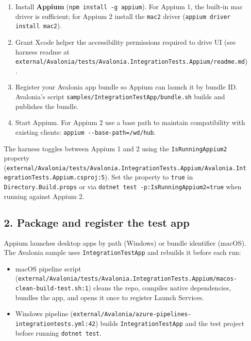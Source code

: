 \begin{enumerate}
\def\labelenumi{\arabic{enumi}.}
\tightlist
\item
  Install \textbf{Appium}
  (\passthrough{\lstinline!npm install -g appium!}). For Appium 1, the
  built-in mac driver is sufficient; for Appium 2 install the
  \passthrough{\lstinline!mac2!} driver
  (\passthrough{\lstinline!appium driver install mac2!}).
\item
  Grant Xcode helper the accessibility permissions required to drive UI
  (see harness readme at
  \passthrough{\lstinline!external/Avalonia/tests/Avalonia.IntegrationTests.Appium/readme.md!}).
\item
  Register your Avalonia app bundle so Appium can launch it by bundle
  ID. Avalonia's script
  \passthrough{\lstinline!samples/IntegrationTestApp/bundle.sh!} builds
  and publishes the bundle.
\item
  Start Appium. For Appium 2 use a base path to maintain compatibility
  with existing clients:
  \passthrough{\lstinline!appium --base-path=/wd/hub!}.
\end{enumerate}

The harness toggles between Appium 1 and 2 using the
\passthrough{\lstinline!IsRunningAppium2!} property
(\passthrough{\lstinline!external/Avalonia/tests/Avalonia.IntegrationTests.Appium/Avalonia.IntegrationTests.Appium.csproj:5!}).
Set the property to \passthrough{\lstinline!true!} in
\passthrough{\lstinline!Directory.Build.props!} or via
\passthrough{\lstinline!dotnet test -p:IsRunningAppium2=true!} when
running against Appium 2.

\subsection{2. Package and register the test
app}\label{package-and-register-the-test-app}

Appium launches desktop apps by path (Windows) or bundle identifier
(macOS). The Avalonia sample uses
\passthrough{\lstinline!IntegrationTestApp!} and rebuilds it before each
run:

\begin{itemize}
\tightlist
\item
  macOS pipeline script
  (\passthrough{\lstinline!external/Avalonia/tests/Avalonia.IntegrationTests.Appium/macos-clean-build-test.sh:1!})
  cleans the repo, compiles native dependencies, bundles the app, and
  opens it once to register Launch Services.
\item
  Windows pipeline
  (\passthrough{\lstinline!external/Avalonia/azure-pipelines-integrationtests.yml:42!})
  builds \passthrough{\lstinline!IntegrationTestApp!} and the test
  project before running \passthrough{\lstinline!dotnet test!}.
\end{itemize}

